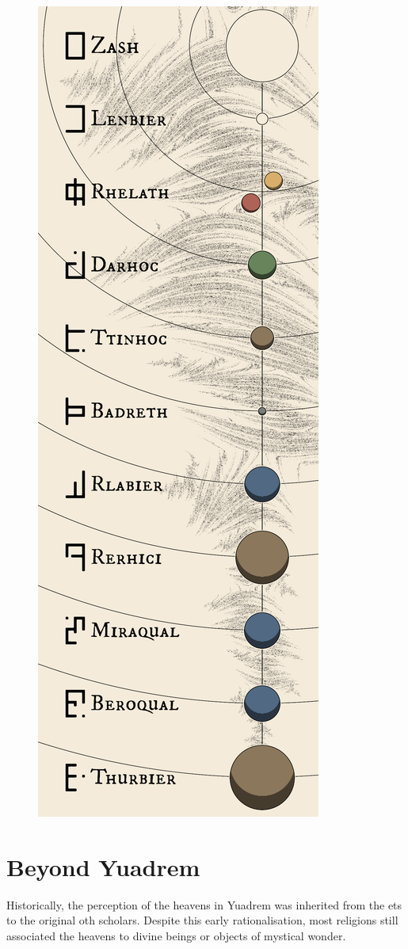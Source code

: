 \begin{figure}[H]
    \centering \includegraphics{01yuadrem/img/41solarsystem.png}
\end{figure}
\section{Beyond Yuadrem}
Historically, the perception of the heavens in Yuadrem was inherited from the ets to the original oth scholars.
Despite this early rationalisation, most religions still associated the heavens to divine beings or objects of mystical wonder.





